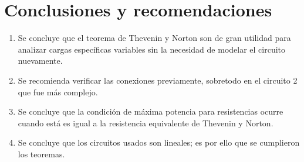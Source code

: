 \documentclass[a4paper,11pt]{report}
\begin{document}
\chapter{Conclusiones y recomendaciones}
\begin{enumerate}
\item Se concluye que el teorema de Thevenin y Norton son de gran utilidad para analizar cargas específicas variables sin la necesidad de modelar el circuito nuevamente.
\item Se recomienda verificar las conexiones previamente, sobretodo en el circuito 2 que fue más complejo.
\item Se concluye que la condición de máxima potencia para resistencias ocurre cuando está es igual a la resistencia equivalente de Thevenin y Norton.
\item Se concluye que los circuitos usados son lineales; es por ello que se cumplieron los teoremas. 
\end{enumerate}
\end{document}
